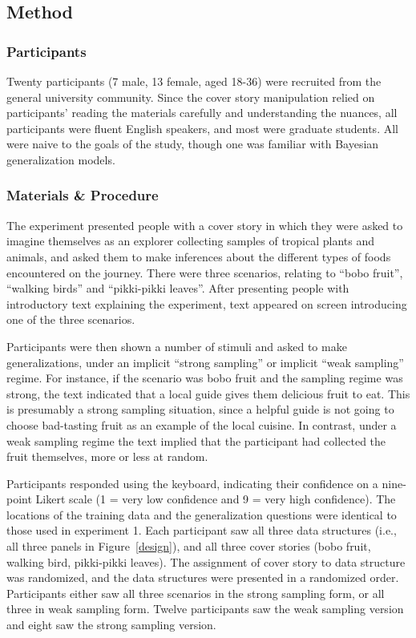 \documentclass[doc]{apa6}
\begin{document}
\subsection{Method}

\subsubsection{Participants} Twenty participants (7 male, 13 female, aged 18-36) were recruited from the general university community. Since the cover story manipulation relied on  participants' reading the materials carefully and understanding the nuances, all participants were fluent English speakers, and most were graduate students. All were naive to the goals of the study, though one was familiar with Bayesian generalization models.

\subsubsection{Materials \& Procedure} The experiment presented people with a cover story in which they were asked to imagine themselves as an explorer collecting samples of tropical plants and animals, and asked them to make inferences about the different types of foods encountered on the journey. There were three scenarios, relating to ``bobo fruit'', ``walking birds'' and ``pikki-pikki leaves''. After presenting people with introductory text explaining the experiment, text appeared on screen introducing one of the three scenarios.

Participants were then shown a number of stimuli and asked to make generalizations, under an implicit ``strong sampling'' or implicit ``weak sampling'' regime. For instance, if the scenario was bobo fruit and the sampling regime was strong, the text indicated that a local guide gives them delicious fruit to eat. This is presumably a strong sampling situation, since a helpful guide is not going to choose bad-tasting fruit as an example of the local cuisine. In contrast, under a weak sampling regime the text implied that the participant had collected the fruit themselves, more or less at random.

Participants responded using the keyboard, indicating their confidence on a nine-point Likert scale (1 = very low confidence and 9 = very high confidence). The locations of the training data and the generalization questions were identical to those used in experiment 1. Each participant saw all three data structures (i.e., all three panels in Figure~\ref{design}), and all three cover stories (bobo fruit, walking bird, pikki-pikki leaves). The assignment of cover story to data structure was randomized, and the data structures were presented in a randomized order. Participants either saw all three scenarios in the strong sampling form, or all three in weak sampling form. Twelve participants saw the weak sampling version and eight saw the strong sampling version.
\end{document}

